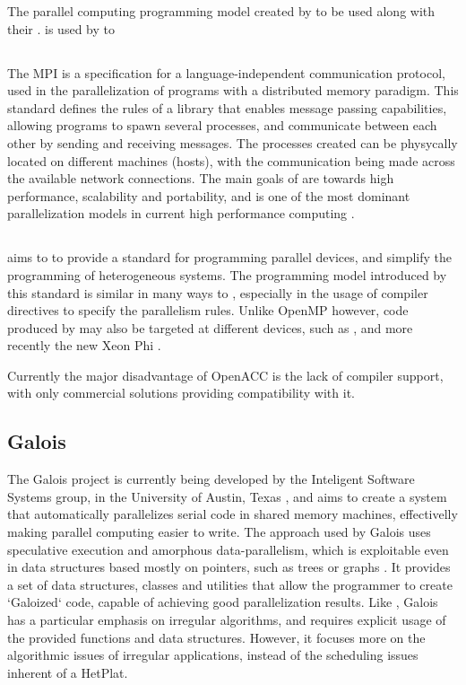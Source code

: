 \documentclass[main.tex]{subfiles}
\begin{document}
The parallel computing programming model created by \nvidia to be used along with their \gpus. 
\cuda is used by \gama to 


\subsection{\mpi}

The \acf{MPI} is a specification for a language-independent communication protocol, used in the parallelization of programs with a distributed memory paradigm. This standard defines the rules of a library that enables message passing capabilities, allowing programs to spawn several processes, and communicate between each other by sending and receiving messages. The processes created can be physycally located on different machines (hosts), with the communication being made across the available network connections. The main goals of \mpi are towards high performance, scalability and portability, and is one of the most dominant parallelization models in current high performance computing \cite{sur2006high}.


\subsection{\openacc}
\openacc aims to to provide a standard for programming parallel devices, and simplify the programming of heterogeneous systems.
The programming model introduced by this standard is similar in many ways to \openmp, especially in the usage of compiler directives to specify the parallelism rules. Unlike \acs{OpenMP} however, code produced by \openacc may also be targeted at different devices, such as \gpus, and more recently the new \intel Xeon Phi \cite{openacc-phi2012}.

Currently the major disadvantage of \acs{OpenACC} is the lack of compiler support, with only commercial solutions providing compatibility with it.


\subsection{Galois}

The Galois project is currently being developed by the Inteligent Software Systems group, in the University of Austin, Texas , and aims to create a system that automatically parallelizes serial code in shared memory machines, effectivelly making parallel computing easier to write.
The approach used by Galois uses speculative execution and amorphous data-parallelism, which is exploitable even in data structures based mostly on pointers, such as trees or graphs \cite{pingaliamorphous,pingali2011tao}. It provides a set of data structures, classes and utilities that allow the programmer to create `Galoized` code, capable of achieving good parallelization results. Like \gama, Galois has a particular emphasis on irregular algorithms, and requires explicit usage of the provided functions and data structures. However, it focuses more on the algorithmic issues of irregular applications, instead of the scheduling issues inherent of a \acs{HetPlat}.
\end{document}
